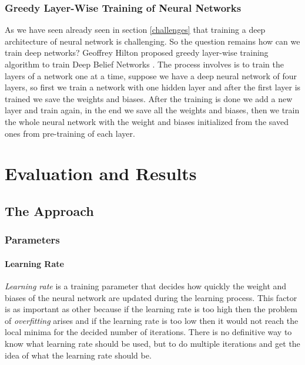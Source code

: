 \documentclass[12pt, a4paper]{report}
\begin{document}
\subsection{Greedy Layer-Wise Training of Neural Networks}\label{greedy}
As we have seen already seen in section \ref{challenges} that training a deep architecture of neural network is challenging. So the question remains how can we train deep networks? Geoffrey Hilton proposed greedy layer-wise training algorithm to train Deep Belief Networks \cite{Greedy}. The process involves is to train the layers of a network one at a time, suppose we have a deep neural network of four layers, so first we train a network with one hidden layer and after the first layer is trained we save the weights and biases. After the training is done we add a new layer and train again, in the end we save all the weights and biases, then we train the whole neural network with the weight and biases initialized from the saved ones from pre-training of each layer.\\ \par


\chapter{Evaluation and Results}\label{sec:EvaluationAndResults}
\section{The Approach}\label{approach}

\subsection{Parameters}
\subsubsection{Learning Rate}
\textit{Learning rate} is a training parameter that decides how quickly the weight and biases of the neural network are updated during the learning process. This factor is as important as other because if the learning rate is too high then the problem of \textit{overfitting} arises and if the learning rate is too low then it would not reach the local minima for the decided number of iterations. There is no definitive way to know what learning rate should be used, but to do multiple iterations and get the idea of what the learning rate should be.\\
\end{document}
